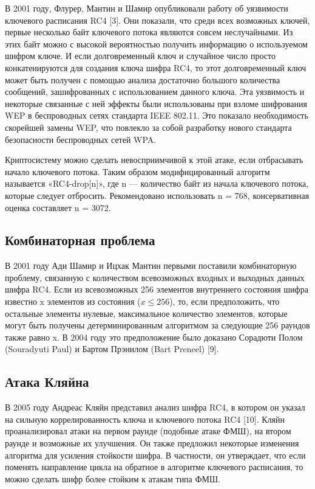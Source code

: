В 2001 году, Флурер, Мантин и Шамир опубликовали работу об уязвимости ключевого
расписания RC4 [3]. Они показали, что среди всех возможных ключей, первые несколько
байт ключевого потока являются совсем неслучайными. Из этих байт можно с высокой
вероятностью получить информацию о используемом шифром ключе. И если
долговременный ключ и случайное число просто конкатенируются для создания ключа
шифра RC4, то этот долговременный ключ может быть получен с помощью анализа
достаточно большого количества сообщений, зашифрованных с использованием данного
ключа. Эта уязвимость и некоторые связанные с ней эффекты были использованы
при взломе шифрования WEP в беспроводных сетях стандарта IEEE 802.11. Это
показало необходимость скорейшей замены WEP, что повлекло за собой разработку
нового стандарта безопасности беспроводных сетей WPA.

Криптосистему можно сделать невосприимчивой к этой атаке, если отбрасывать
начало ключевого потока. Таким образом модифицированный алгоритм называется
«RC4-drop[n]», где n --- количество байт из начала ключевого потока, которые
следует отбросить. Рекомендовано использовать n = 768, консервативная оценка
составляет n = 3072.

\subsection{Комбинаторная проблема}

В 2001 году Ади Шамир и Ицхак Мантин первыми поставили комбинаторную проблему,
связанную с количеством всевозможных входных и выходных данных шифра RC4. Если
из всевозможных 256 элементов внутреннего состояния шифра известно x элементов
из состояния ($x \le 256$), то, если предположить, что остальные элементы нулевые,
максимальное количество элементов, которые могут быть получены детерминированным
алгоритмом за следующие 256 раундов также равно x. В 2004 году это предположение
было доказано Сорадюти Полом (Souradyuti Paul) и Бартом Прэнилом (Bart Preneel) [9].


\subsection{Атака Кляйна}

В 2005 году Андреас Кляйн представил анализ шифра RC4, в котором он указал на
сильную коррелированность ключа и ключевого потока RC4 [10]. Кляйн
проанализировал атаки на первом раунде (подобные атаке ФМШ), на втором раунде и
возможные их улучшения. Он также предложил некоторые изменения алгоритма для
усиления стойкости шифра. В частности, он утверждает, что если поменять
направление цикла на обратное в алгоритме ключевого расписания, то можно сделать
шифр более стойким к атакам типа ФМШ.


